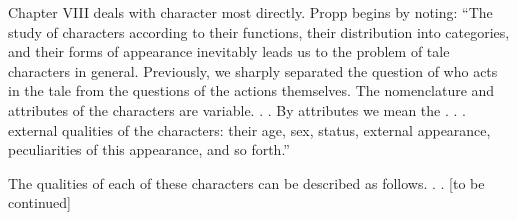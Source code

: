 \documentclass{report}\usepackage[]{graphicx}\usepackage[]{color}
\begin{document}
Chapter VIII deals with character most directly.  Propp begins by noting: ``The study of characters according to their functions, their distribution into categories, and their forms of appearance inevitably leads us to the problem of tale characters in general.  Previously, we sharply separated the question of who acts in the tale from the questions of the actions themselves.  The nomenclature and attributes of the characters are variable. . . By attributes we mean the . . . external qualities of the characters: their age, sex, status, external appearance, peculiarities of this appearance, and so forth.''

The qualities of each of these characters can be described as follows. . . [to be continued]
\end{document}

